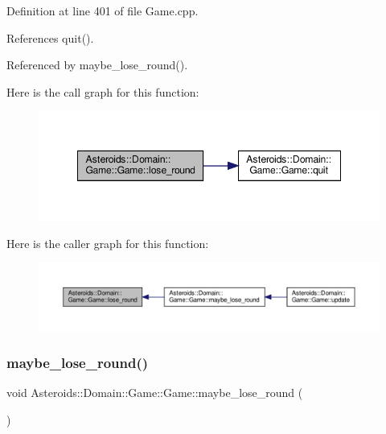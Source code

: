 Definition at line 401 of file Game.\+cpp.



References quit().



Referenced by maybe\+\_\+lose\+\_\+round().

Here is the call graph for this function\+:\nopagebreak
\begin{figure}[H]
\begin{center}
\leavevmode
\includegraphics[width=348pt]{classAsteroids_1_1Domain_1_1Game_1_1Game_aca6a4c9568d4bffcd9b1ff331c338abb_cgraph}
\end{center}
\end{figure}
Here is the caller graph for this function\+:\nopagebreak
\begin{figure}[H]
\begin{center}
\leavevmode
\includegraphics[width=350pt]{classAsteroids_1_1Domain_1_1Game_1_1Game_aca6a4c9568d4bffcd9b1ff331c338abb_icgraph}
\end{center}
\end{figure}
\mbox{\label{classAsteroids_1_1Domain_1_1Game_1_1Game_a5b851b86192080f5f59d61f689bf97a4}} 
\subsubsection{\texorpdfstring{maybe\+\_\+lose\+\_\+round()}{maybe\_lose\_round()}}
{\footnotesize\ttfamily void Asteroids\+::\+Domain\+::\+Game\+::\+Game\+::maybe\+\_\+lose\+\_\+round (\begin{DoxyParamCaption}{ }\end{DoxyParamCaption})\hspace{0.3cm}{\ttfamily [private]}}



